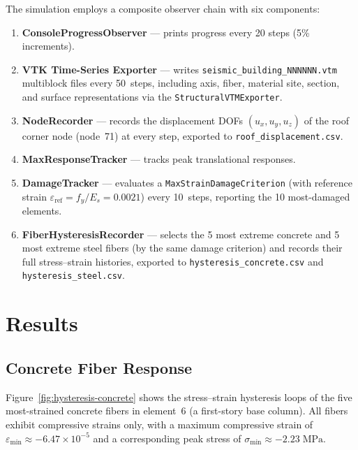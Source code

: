The simulation employs a composite observer chain with six components:

\begin{enumerate}[nosep]
  \item \textbf{ConsoleProgressObserver} --- prints progress every 20
        steps (5\% increments).
  \item \textbf{VTK Time-Series Exporter} --- writes
        \texttt{seismic\_building\_NNNNNN.vtm} multiblock files every
        50~steps, including axis, fiber, material site, section, and
        surface representations via the
        \texttt{StructuralVTMExporter}.
  \item \textbf{NodeRecorder} --- records the displacement DOFs
        $(u_x, u_y, u_z)$ of the roof corner node (node~71) at every
        step, exported to \texttt{roof\_displacement.csv}.
  \item \textbf{MaxResponseTracker} --- tracks peak translational
        responses.
  \item \textbf{DamageTracker} --- evaluates a
        \texttt{MaxStrainDamageCriterion} (with reference strain
        $\varepsilon_\mathrm{ref} = f_y / E_s = 0.0021$) every 10~steps,
        reporting the 10 most-damaged elements.
  \item \textbf{FiberHysteresisRecorder} --- selects the 5 most extreme
        concrete and 5 most extreme steel fibers (by the same damage
        criterion) and records their full stress--strain histories,
        exported to \texttt{hysteresis\_concrete.csv} and
        \texttt{hysteresis\_steel.csv}.
\end{enumerate}


\section{Results}
\label{sec:seismic-rc-results}

\subsection{Concrete Fiber Response}

Figure~\ref{fig:hysteresis-concrete} shows the stress--strain
hysteresis loops of the five most-strained concrete fibers in
element~6 (a first-story base column).  All fibers exhibit
compressive strains only, with a maximum compressive strain of
$\varepsilon_{\min} \approx -6.47 \times 10^{-5}$ and a corresponding
peak stress of $\sigma_{\min} \approx -2.23\;\mathrm{MPa}$.

